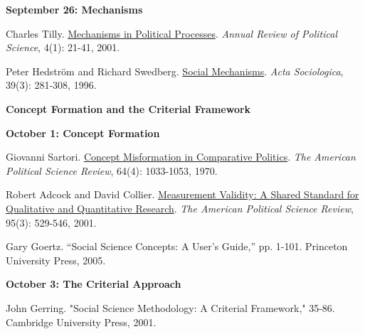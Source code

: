 \documentclass[letterpaper]{article}
\renewenvironment{itemize}{
  \begin{list}{}{
    \setlength{\leftmargin}{1.5em}
  }
}{
  \end{list}
}
\begin{document}
\begin{enumerate}
		\begin{itemize}
		\item {\bf September 26: Mechanisms}
			\begin{itemize}
					\item[$\bullet$] Charles Tilly. \href{https://www.annualreviews.org/doi/pdf/10.1146/annurev.polisci.4.1.21}{Mechanisms in Political Processes}. \emph{Annual Review of Political Science}, 4(1): 21-41, 2001. 
					\item[$\bullet$] Peter Hedstr\"om and Richard Swedberg. \href{http://www.jstor.org/stable/4194832}{Social Mechanisms}. \emph{Acta Sociologica}, 39(3): 281-308, 1996. 
			\end{itemize}
		\end{itemize}






\item {\bf Concept Formation and the Criterial Framework}
		
		\begin{itemize}
		\item {\bf October 1: Concept Formation}
			\begin{itemize}
				\item[$\bullet$] Giovanni Sartori. \href{https://doi.org/10.2307/1958356}{Concept Misformation in Comparative Politics}. \emph{The American Political Science Review}, 64(4): 1033-1053, 1970.
				\item[$\bullet$] Robert Adcock and David Collier. \href{http://www.jstor.org/stable/3118231}{Measurement Validity: A Shared Standard for Qualitative and Quantitative Research}. \emph{The American Political Science Review}, 95(3): 529-546, 2001.
				\item[$\bullet$] Gary Goertz. ``Social Science Concepts: A User's Guide,'' pp. 1-101. Princeton University Press, 2005. 
			\end{itemize}
		\end{itemize}



		\begin{itemize}
		\item {\bf October 3: The Criterial Approach}
			\begin{itemize}
				\item[$\bullet$] John Gerring. "Social Science Methodology: A Criterial Framework," 35-86. Cambridge University Press, 2001. 
			\end{itemize}
		\end{itemize}



\end{enumerate}
\end{document}
